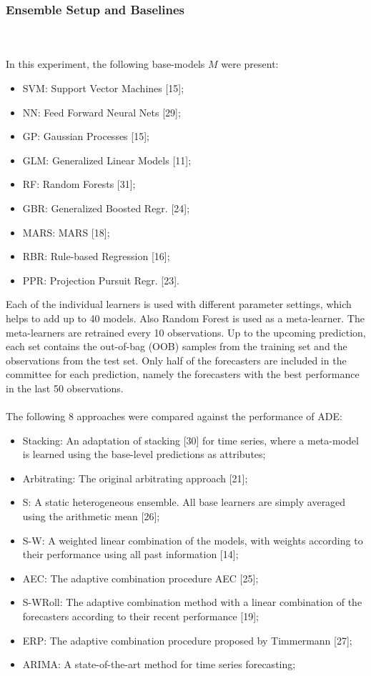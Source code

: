\documentclass[runningheads,a4paper]{llncs}[2015/06/24]
\begin{document}
\subsubsection{Ensemble Setup and Baselines}
\hspace{1cm}\\\\ In this experiment, the following base-models $M$ were present:
\begin{itemize}
\item SVM: Support Vector Machines [15];
\item NN: Feed Forward Neural Nets [29];
\item GP: Gaussian Processes [15];
\item GLM: Generalized Linear Models [11];
\item RF: Random Forests [31];
\item GBR: Generalized Boosted Regr. [24];
\item MARS: MARS [18];
\item RBR: Rule-based Regression [16];
\item PPR: Projection Pursuit Regr. [23].
\end{itemize}
Each of the individual learners is used with different parameter settings, which helps to add up to 40 models. Also Random Forest is used as a meta-learner. The meta-learners are retrained every 10 observations. Up to the upcoming prediction, each set contains the out-of-bag (OOB) samples from the training set and the observations from the test set. Only half of the forecasters are included in the committee for each prediction, namely the forecasters with the best performance in the last 50 observations. \\\\ The following 8 approaches were compared against the performance of ADE: 
\begin{itemize}
\item Stacking: An adaptation of stacking [30] for time series, where a meta-model is learned using the base-level predictions as attributes; 
\item Arbitrating: The original arbitrating approach [21];
\item S: A static heterogeneous ensemble. All base learners are simply averaged using the arithmetic mean [26];
\item S-W: A weighted linear combination of the models, with weights according to their performance using all past information [14];
\item AEC: The adaptive combination procedure AEC [25];
\item S-WRoll: The adaptive combination method with a linear combination of the forecasters according to their recent performance [19];
\item ERP: The adaptive combination procedure proposed by Timmermann [27];
\item ARIMA: A state-of-the-art method for time series forecasting;
\end{itemize}
\end{document}
